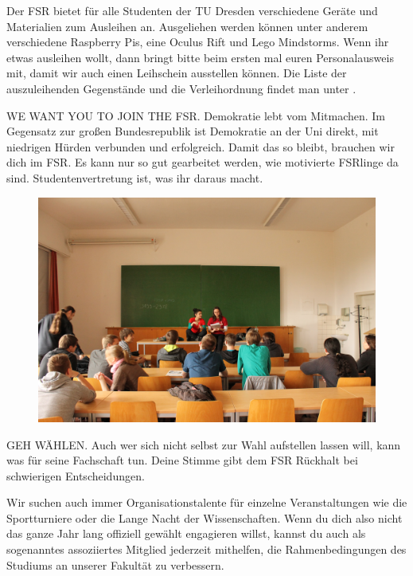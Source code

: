 Der FSR bietet für alle Studenten der TU Dresden verschiedene Geräte und Materialien zum Ausleihen an. Ausgeliehen werden können unter anderem verschiedene Raspberry Pis, eine Oculus Rift und Lego Mindstorms.
 Wenn ihr etwas ausleihen wollt, dann bringt bitte beim ersten mal euren Personalausweis mit, damit wir auch einen Leihschein ausstellen können. 
Die Liste der auszuleihenden Gegenstände und die Verleihordnung findet man unter .

WE WANT YOU TO JOIN THE FSR.
Demokratie lebt vom Mitmachen.
Im Gegensatz zur großen Bundesrepublik ist Demokratie an der Uni direkt, mit niedrigen Hürden verbunden und erfolgreich.
Damit das so bleibt, brauchen wir dich im FSR.
Es kann nur so gut gearbeitet werden, wie motivierte FSRlinge da sind.
Studentenvertretung ist, was ihr daraus macht.

\begin{figure}
\includegraphics[width=\linewidth]{img/ese2013/tutorium.jpg}
\end{figure}

GEH WÄHLEN.
Auch wer sich nicht selbst zur Wahl aufstellen lassen will, kann was für seine Fachschaft tun.
Deine Stimme gibt dem FSR Rückhalt bei schwierigen Entscheidungen.

Wir suchen auch immer Organisationstalente für einzelne Veranstaltungen wie die Sportturniere oder die Lange Nacht der Wissenschaften.
Wenn du dich also nicht das ganze Jahr lang offiziell gewählt engagieren willst, kannst du auch als sogenanntes assoziiertes Mitglied jederzeit mithelfen, die Rahmenbedingungen des Studiums an unserer Fakultät zu verbessern.

